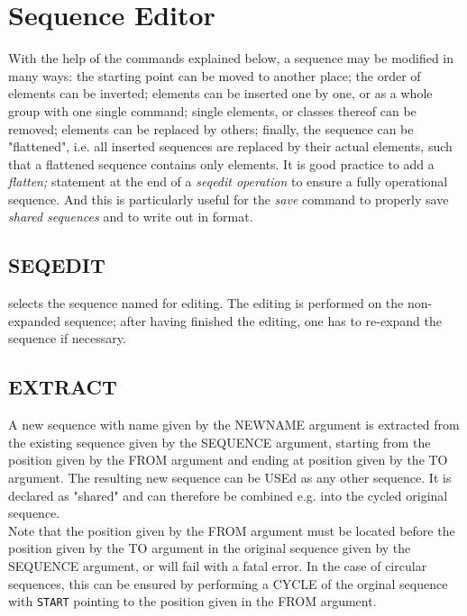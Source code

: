 
\chapter{Sequence Editor}
\label{chap:seqedit}
With the help of the commands explained below, a sequence may be
modified in many ways: the starting point can be moved to another place;
the order of elements can be inverted; elements can be inserted one by
one, or as a whole group with one single command; single elements, or
classes thereof can be removed; elements can be replaced by others;
finally, the sequence can be "flattened", i.e. all inserted sequences
are replaced by their actual elements, such that a flattened sequence
contains only elements. It is good practice to add a \textit{ flatten; }
statement at the end of a \textit{ seqedit operation } to ensure a fully
operational sequence. And this is particularly useful for the \textit{
  save } command to properly save \textit{ shared sequences } and to
write out in \madeight format.  


\section{SEQEDIT}
\label{sec:seqedit}
selects the sequence named for editing. The editing is performed on the
non-expanded sequence; after having finished the editing, one has to
re-expand the sequence if necessary.  

\section{EXTRACT}
\label{sec:extract}
A new sequence with name given by the NEWNAME argument is extracted from
the existing sequence given by the SEQUENCE argument, 
starting from the position given by the FROM argument and ending at
position given by the TO argument. The resulting new sequence
can be USEd as any other sequence. It is declared as "shared" and
can therefore be combined e.g. into the cycled original sequence. \\ 
Note that the position given by the FROM argument must be located before
the position given by the TO argument in the original sequence given by
the SEQUENCE argument, or \mad will fail with a fatal error. 
In the case of circular sequences, this can be ensured by performing a CYCLE 
of the orginal sequence with {\tt START} pointing to the position given
in the FROM argument. 

